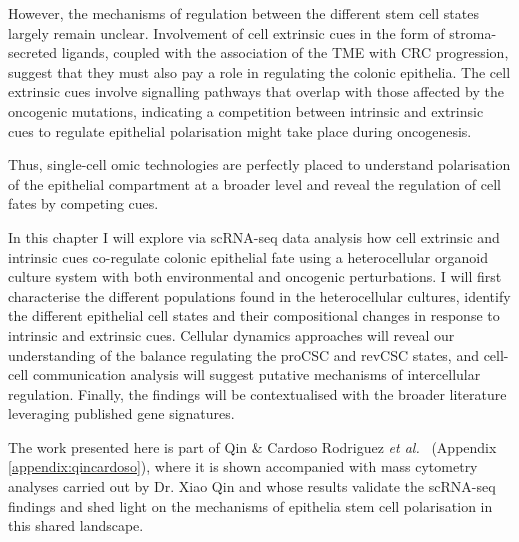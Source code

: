 However, the mechanisms of regulation between the different stem cell states largely remain unclear.
Involvement of cell extrinsic cues in the form of stroma-secreted ligands, coupled with the association of the TME with CRC progression, suggest that they must also pay a role in regulating the colonic epithelia. The cell extrinsic cues involve signalling pathways that overlap with those affected by the oncogenic mutations, %
indicating a competition between intrinsic and extrinsic cues to regulate epithelial polarisation might take place during oncogenesis.


Thus, single-cell omic technologies are perfectly placed to understand polarisation of the epithelial compartment at a broader level and reveal the regulation of cell fates by competing cues.

In this chapter I will explore via scRNA-seq data analysis how cell extrinsic and intrinsic cues co-regulate colonic epithelial fate using a heterocellular organoid culture system with both environmental and oncogenic perturbations. I will first characterise the different populations found in the heterocellular cultures, identify the different epithelial cell states and their compositional changes in response to intrinsic and extrinsic cues. Cellular dynamics approaches will reveal our understanding of the balance regulating the proCSC and revCSC states, and cell-cell communication analysis will suggest putative mechanisms of intercellular regulation. Finally, the findings will be contextualised with the broader literature leveraging published gene signatures.

The work presented here is part of Qin \& Cardoso Rodriguez \emph{et al.}~\cite{cardoso_rodriguez_single-cell_2023} (Appendix \ref{appendix:qincardoso}), where it is shown accompanied with mass cytometry analyses carried out by Dr. Xiao Qin and whose results validate the scRNA-seq findings and shed light on the mechanisms of epithelia stem cell polarisation in this shared landscape.

